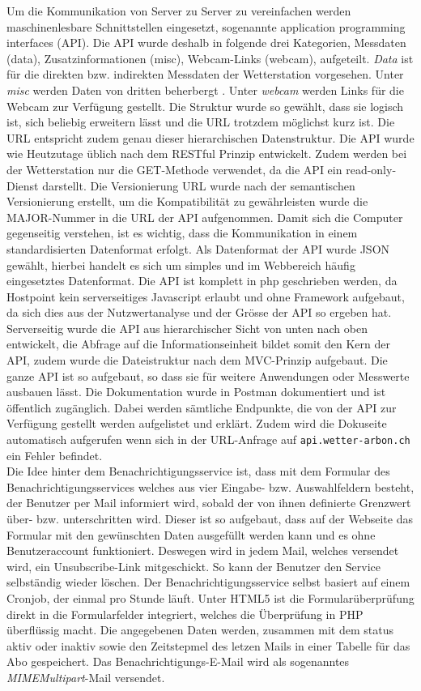 \documentclass[10pt]{article}
\begin{document}
\begin{multicols}{2}
Um die Kommunikation von Server zu Server zu vereinfachen werden maschinenlesbare Schnittstellen eingesetzt, sogenannte application programming interfaces (API). Die API wurde deshalb in folgende drei Kategorien, Messdaten (data), Zusatzinformationen (misc), Webcam-Links (webcam), aufgeteilt. \emph{Data} ist für die direkten bzw. indirekten Messdaten der Wetterstation vorgesehen. Unter \emph{misc} werden Daten von dritten beherbergt . Unter \emph{webcam} werden Links für die Webcam zur Verfügung gestellt. Die Struktur wurde so gewählt, dass sie logisch ist, sich beliebig erweitern lässt und die URL trotzdem möglichst kurz ist. Die URL entspricht zudem genau dieser hierarchischen Datenstruktur. Die API wurde wie Heutzutage üblich nach dem RESTful Prinzip entwickelt. Zudem werden bei der Wetterstation nur die GET-Methode verwendet, da die API ein read-only-Dienst darstellt. Die Versionierung URL wurde nach der semantischen Versionierung erstellt, um die Kompatibilität zu gewährleisten wurde die MAJOR-Nummer in die URL der API aufgenommen. Damit sich die Computer gegenseitig verstehen, ist es wichtig, dass die Kommunikation in einem standardisierten Datenformat erfolgt. Als Datenformat der API wurde JSON gewählt, hierbei handelt es sich um simples und im Webbereich häufig eingesetztes Datenformat. Die API ist komplett in php geschrieben werden, da Hostpoint kein serverseitiges Javascript erlaubt und ohne Framework aufgebaut, da sich dies aus der Nutzwertanalyse und der Grösse der API so ergeben hat. Serverseitig wurde die API aus hierarchischer Sicht von unten nach oben entwickelt, die Abfrage auf die Informationseinheit bildet somit den Kern der API, zudem wurde die Dateistruktur nach dem MVC-Prinzip aufgebaut. Die ganze API ist so aufgebaut, so dass sie für weitere Anwendungen oder Messwerte ausbauen lässt. Die Dokumentation wurde in Postman dokumentiert und ist öffentlich zugänglich. Dabei werden sämtliche Endpunkte, die von der API zur Verfügung gestellt werden aufgelistet und erklärt. Zudem wird die Dokuseite automatisch aufgerufen wenn sich in der URL-Anfrage auf \texttt{api.wetter-arbon.ch} ein Fehler befindet.\\
Die Idee hinter dem Benachrichtigungsservice ist, dass mit dem  Formular des Benachrichtigungsservices welches aus vier Eingabe- bzw. Auswahlfeldern besteht, der Benutzer per Mail informiert wird, sobald der von ihnen definierte Grenzwert über- bzw. unterschritten wird.  Dieser ist so aufgebaut, dass auf der Webseite das Formular mit den gewünschten Daten ausgefüllt werden kann und es ohne Benutzeraccount funktioniert. Deswegen wird in jedem Mail, welches versendet wird, ein Unsubscribe-Link mitgeschickt. So kann der Benutzer den Service selbständig wieder löschen. Der Benachrichtigungsservice selbst basiert auf einem Cronjob, der einmal pro Stunde läuft. Unter HTML5 ist die Formularüberprüfung direkt in die Formularfelder integriert, welches die Überprüfung in PHP überflüssig macht. Die angegebenen Daten werden, zusammen mit dem status aktiv oder inaktiv sowie den Zeitstepmel des letzen Mails in einer Tabelle für das Abo gespeichert. Das Benachrichtigungs-E-Mail wird als sogenanntes \emph{MIMEMultipart}-Mail versendet.


\end{multicols}
\end{document}
